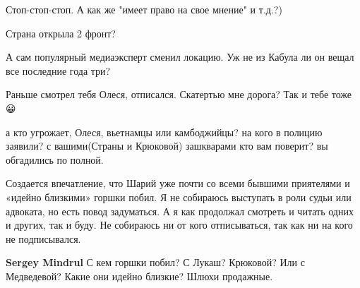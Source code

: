 \begin{itemize}
Стоп-стоп-стоп. А как же "имеет право на свое мнение" и т.д.?)

 
Страна открыла 2 фронт?

 
А сам популярный медиаэксперт сменил локацию. Уж не из Кабула ли он вещал все последние года три?

 
Раньше смотрел тебя Олеся, отписался. Скатертью мне дорога? Так и тебе тоже 😀

 

а кто угрожает, Олеся, вьетнамцы или камбоджийцы? на кого в полицию заявили? с
вашими(Страны и Крюковой) зашкварами кто вам поверит? вы обгадились по полной.


Создается впечатление, что Шарий уже почти со всеми бывшими приятелями и
«идейно близкими» горшки побил. Я не собираюсь выступать в роли судьи или
адвоката, но есть повод задуматься. А я как продолжал смотреть и читать одних и
других, так и буду. Не собираюсь ни от кого отписываться, так как ни на кого не
подписывался.

\begin{itemize}
 
\textbf{Sergey Mindrul} С кем горшки побил? С Лукаш? Крюковой? Или с Медведевой? Какие они идейно близкие? Шлюхи продажные.

 

\end{itemize}
\end{itemize}
